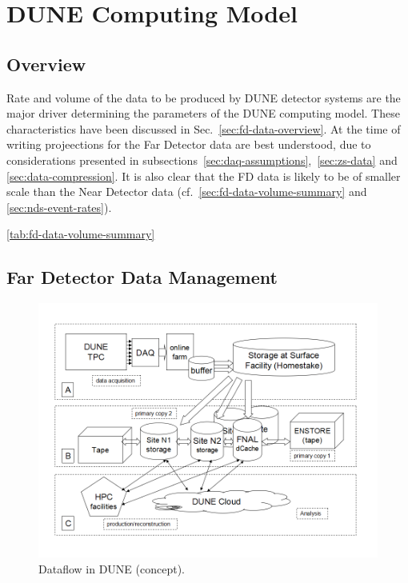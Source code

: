 \section{DUNE Computing Model}
\label{sec:computing_model}

\subsection{Overview}
Rate and volume of the data to be produced by DUNE detector systems are the major driver determining the parameters
of the DUNE computing model. These characteristics  have been discussed in Sec.~\ref{sec:fd-data-overview}.
At the time of writing projeections for the Far Detector data are best understood, due to considerations presented in
subsections~\ref{sec:daq-assumptions},~\ref{sec:zs-data} and \ref{sec:data-compression}.
It is also clear that the FD data is likely to be of smaller scale than the Near Detector data
(cf.~\ref{sec:fd-data-volume-summary} and \ref{sec:nds-event-rates}).


\ref{tab:fd-data-volume-summary}

\subsection{Far Detector Data Management}

\begin{figure}[h!]
\centering
\includegraphics[width=\textwidth]{DUNEdataflow.png}
\caption{Dataflow in DUNE (concept).}
\label{fig:DUNEdataflow}
\end{figure}
